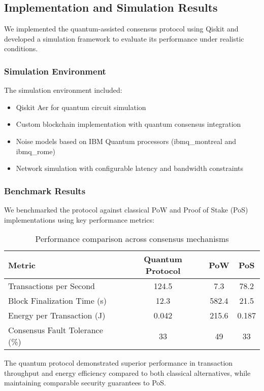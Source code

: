 \documentclass[11pt,a4paper]{article}
\begin{document}
\subsection{Implementation and Simulation Results}
We implemented the quantum-assisted consensus protocol using Qiskit and developed a simulation framework to evaluate its performance under realistic conditions.

\subsubsection{Simulation Environment}
The simulation environment included:
\begin{itemize}
    \item Qiskit Aer for quantum circuit simulation
    \item Custom blockchain implementation with quantum consensus integration
    \item Noise models based on IBM Quantum processors (ibmq\_montreal and ibmq\_rome)
    \item Network simulation with configurable latency and bandwidth constraints
\end{itemize}

\subsubsection{Benchmark Results}
We benchmarked the protocol against classical PoW and Proof of Stake (PoS) implementations using key performance metrics:

\begin{table}[H]
\centering
\begin{tabular}{lccc}
\toprule
\textbf{Metric} & \textbf{Quantum Protocol} & \textbf{PoW} & \textbf{PoS} \\
\midrule
Transactions per Second & 124.5 & 7.3 & 78.2 \\
Block Finalization Time (s) & 12.3 & 582.4 & 21.5 \\
Energy per Transaction (J) & 0.042 & 215.6 & 0.187 \\
Consensus Fault Tolerance (\%) & 33 & 49 & 33 \\
\bottomrule
\end{tabular}
\caption{Performance comparison across consensus mechanisms}
\label{tab:benchmarks}
\end{table}

The quantum protocol demonstrated superior performance in transaction throughput and energy efficiency compared to both classical alternatives, while maintaining comparable security guarantees to PoS.
\end{document}
